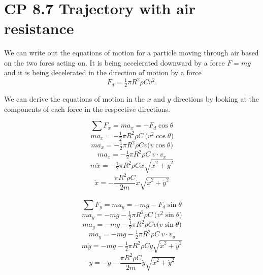 \documentclass[11pt]{article}
\begin{document}
    \begin{center}
    \end{center}
    { \hspace*{\fill} \\}
    
    \section{CP 8.7 Trajectory with air
resistance}\label{cp-8.7-trajectory-with-air-resistance}

We can write out the equations of motion for a particle moving through
air based on the two fores acting on. It is being accelerated downward
by a force \(F = mg\) and it is being decelerated in the direction of
motion by a force \[F_d = \tfrac12 \pi R^2\rho C v^2.\]

We can derive the equations of motion in the \(x\) and \(y\) directions
by looking at the components of each force in the respective directions.

\begin{equation*}
\sum F_x = ma_x = -F_d \cos\theta
\end{equation*}
\begin{equation*}
ma_x = -\tfrac12 \pi R^2\rho C\ \bigr(v^2\cos\theta\bigr)
\end{equation*}
\begin{equation*}
ma_x = -\tfrac12 \pi R^2\rho Cv \bigr(v\cos\theta\bigr)
\end{equation*}
\begin{equation*}
ma_x = -\tfrac12 \pi R^2\rho C\ v\cdot v_x
\end{equation*}
\begin{equation*}
m\ddot{x} = -\tfrac12 \pi R^2\rho C\dot{x}\sqrt{\dot{x}^2 + \dot{y}^2}
\end{equation*}
\begin{equation}
\ddot{x} = -\frac{\pi R^2\rho C}{2m}\dot{x}\sqrt{\dot{x}^2 + \dot{y}^2}
\end{equation}
\\
\begin{equation*}
\sum F_y = ma_y = -mg - F_d \sin\theta
\end{equation*}
\begin{equation*}
ma_y = -mg -\tfrac12 \pi R^2\rho C\ \bigr(v^2\sin\theta\bigr)
\end{equation*}
\begin{equation*}
ma_y = -mg -\tfrac12 \pi R^2\rho Cv \bigr(v\sin\theta\bigr)
\end{equation*}
\begin{equation*}
ma_y = -mg -\tfrac12 \pi R^2\rho C\ v\cdot v_y
\end{equation*}
\begin{equation*}
m\ddot{y} = -mg-\tfrac12 \pi R^2\rho C\dot{y}\sqrt{\dot{x}^2 + \dot{y}^2}
\end{equation*}
\begin{equation}
\ddot{y} = -g -\frac{\pi R^2\rho C}{2m}\dot{y}\sqrt{\dot{x}^2 + \dot{y}^2}
\end{equation}
\end{document}
